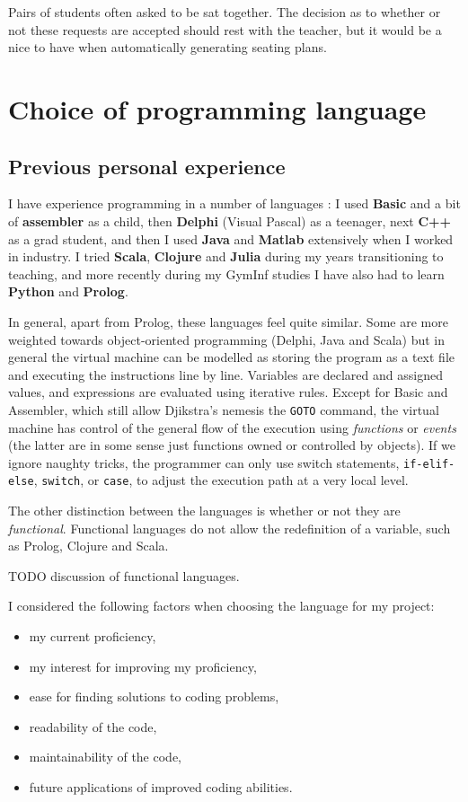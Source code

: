 \documentclass[10pt]{article}
\begin{document}
Pairs of students often asked to be sat together. The decision as to whether or not these requests are accepted should rest with the teacher, but it would be a nice to have when automatically generating seating plans.


\section{Choice of programming language} \label{language}

\subsection{Previous personal experience}

I have experience programming in a number of languages : I used \textbf{Basic} and a bit of \textbf{assembler} as a child, then \textbf{Delphi} (Visual Pascal) as a teenager, next \textbf{C++} as a grad student, and then I used \textbf{Java} and \textbf{Matlab} extensively when I worked in industry. I tried \textbf{Scala}, \textbf{Clojure} and \textbf{Julia} during my years transitioning to teaching, and more recently during my GymInf studies I have also had to learn \textbf{Python} and \textbf{Prolog}.

In general, apart from Prolog, these languages feel quite similar. Some are more weighted towards object-oriented programming (Delphi, Java and Scala) but in general the virtual machine can be modelled as storing the program as a text file and executing the instructions line by line. Variables are declared and assigned values, and expressions are evaluated using iterative rules. Except for Basic and Assembler, which still allow Djikstra's nemesis the \texttt{GOTO} command, the virtual machine has control of the general flow of the execution using \emph{functions} or \emph{events} (the latter are in some sense just functions owned or controlled by objects). If we ignore naughty tricks, the programmer can only use switch statements, \texttt{if-elif-else}, \texttt{switch}, or \texttt{case}, to adjust the execution path at a very local level.

The other distinction between the languages is whether or not they are \emph{functional}. Functional languages do not allow the redefinition of a variable, such as Prolog, Clojure and Scala. 


TODO discussion of functional languages.

I considered the following factors when choosing the language for my project:
\begin{itemize}
\item my current proficiency,
\item my interest for improving my proficiency,
\item ease for finding solutions to coding problems,
\item readability of the code,
\item maintainability of the code,
\item future applications of improved coding abilities.
\end{itemize}
\end{document}
